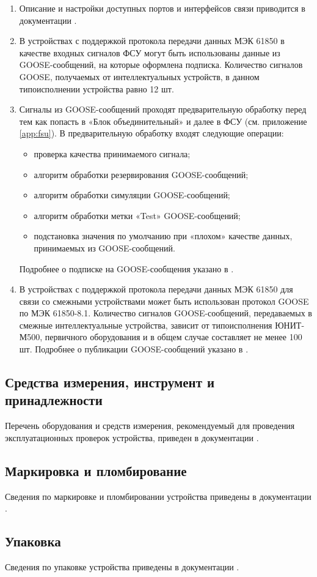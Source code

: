\begin{enumerate}
\item \sloppy Описание и настройки доступных портов и интерфейсов связи приводится в документации \ManualUnitGeneral.
\item В устройствах с поддержкой протокола передачи данных МЭК 61850 в качестве входных сигналов ФСУ могут быть использованы данные из GOOSE-сообщений, на которые оформлена подписка.
Количество сигналов GOOSE, получаемых от интеллектуальных устройств, в данном типоисполнении устройства равно 12 шт.
\item Сигналы из GOOSE-сообщений проходят предварительную обработку перед тем как попасть в «Блок объединительный» и далее в ФСУ (см. приложение \ref{app:fsu}).
В предварительную обработку входят следующие операции:
\begin{itemize}
\item проверка качества принимаемого сигнала;
\item алгоритм обработки резервирования GOOSE-сообщений;
\item алгоритм обработки симуляции GOOSE-сообщений;
\item алгоритм обработки метки «Test» GOOSE-сообщений;
\item подстановка значения по умолчанию при «плохом» качестве данных, принимаемых из GOOSE-сообщений.
\end{itemize}
Подробнее о подписке на GOOSE-сообщения указано в \ManualUnitSRZA.
\item В устройствах с поддержкой протокола передачи данных МЭК 61850 для связи со смежными устройствами может быть использован протокол GOOSE по МЭК 61850-8.1.
Количество сигналов GOOSE-сообщений, передаваемых в смежные интеллектуальные устройства, зависит от типоисполнения ЮНИТ-М500, первичного оборудования и в общем случае составляет не менее 100 шт.
Подробнее о публикации GOOSE-сообщений указано в \ManualUnitSRZA.
\end{enumerate}

{\color{unimain}\subsection{Средства измерения, инструмент и принадлежности}}
Перечень оборудования и средств измерения, рекомендуемый для проведения эксплуатационных проверок устройства, приведен в документации \ManualUnitGeneral.

{\color{unimain}\subsection{Маркировка и пломбирование}}
Сведения по маркировке и пломбировании устройства приведены в документации \ManualUnitGeneral.

{\color{unimain}\subsection{Упаковка}}
Сведения по упаковке устройства приведены в документации \ManualUnitGeneral.
